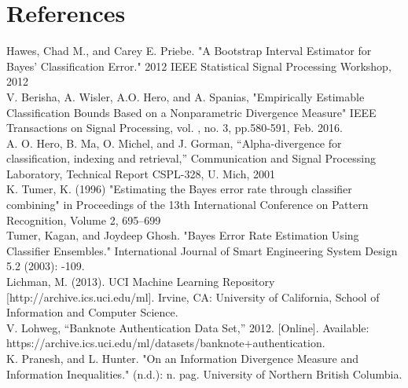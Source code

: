\documentclass{article}
\begin{document}
	
	\newpage
	\section*{References}
	\noindent [1] Hawes, Chad M., and Carey E. Priebe. "A Bootstrap Interval Estimator for Bayes' Classification 
	\indent Error." 2012 IEEE Statistical Signal Processing Workshop, 2012
	\\ [0.5ex]
	
	\noindent[2] V. Berisha, A. Wisler, A.O. Hero, and A. Spanias, "Empirically Estimable Classification Bounds 
	\indent Based on a Nonparametric Divergence Measure" IEEE Transactions on Signal Processing, vol. 
	, no. 3, pp.580-591, Feb. 2016.
	\\ [0.5ex]
	
	\noindent[3] A. O. Hero, B. Ma, O. Michel, and J. Gorman, “Alpha-divergence for classification, indexing 
	\indent and retrieval,” Communication and Signal Processing Laboratory, Technical Report CSPL-328, 
	\indent U. Mich, 2001
	\\ [0.5ex]
	
	\noindent [4] K. Tumer, K. (1996) "Estimating the Bayes error rate through classifier combining" in Proceedings 
	\indent of the 13th International Conference on Pattern Recognition, Volume 2, 695–699
	\\ [0.5ex]
	
	\noindent[5] Tumer, Kagan, and Joydeep Ghosh. "Bayes Error Rate Estimation Using Classifier Ensembles." 
	\indent International Journal of Smart Engineering System Design 5.2 (2003): -109.
	\\ [0.5ex]
	
	\noindent[6] Lichman, M. (2013). UCI Machine Learning Repository [http://archive.ics.uci.edu/ml]. Irvine, 
	\indent CA: University of California, School of Information and Computer Science.
	\\ [0.5ex]
	
	\noindent [7] V. Lohweg, “Banknote Authentication Data Set,” 2012. [Online]. Available: https://archive.ics.uci.edu/ml/datasets/banknote+authentication.
	\\ [0.5ex]
	
	\noindent [8] K. Pranesh, and L. Hunter. "On an Information Divergence Measure and Information Inequalities." (n.d.): n. pag. University of Northern British Columbia. 
	\\ [0.5ex]
	
\end{document}
